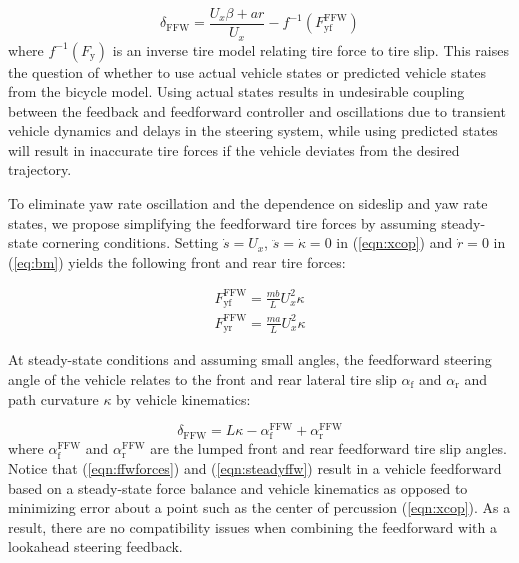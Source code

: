 \begin{equation}
\label{eqn:bikeffw}
\delta_\mathrm{FFW} = \frac{U_x\beta + ar}{U_x} - f^{-1}(F^\mathrm{FFW}_\mathrm{yf})
\end{equation}
where $f^{-1}(F_\mathrm{y})$ is an inverse tire model relating tire force to tire slip. This raises the question of 
whether to use actual vehicle states or predicted vehicle states from the bicycle model. Using actual states
results in undesirable coupling between the feedback and feedforward controller and oscillations due to transient vehicle dynamics and 
delays in the steering system, while using predicted states will result in inaccurate tire forces if the vehicle deviates from the desired trajectory.

To eliminate yaw rate oscillation and the dependence on sideslip and yaw rate states,
 we propose simplifying the feedforward tire forces by assuming steady-state cornering conditions. Setting $\dot{s} = U_x$, $\ddot{s} = \dot{\kappa} = 0$
in (\ref{eqn:xcop}) and $\dot{r} = 0$ in (\ref{eq:bm}) yields the following front and rear tire forces:

\begin{subequations}
\label{eqn:ffwforces}
\begin{align}
  F_\mathrm{yf}^\mathrm{FFW} = \frac{mb}{L} U_x^2\kappa\\
   F_\mathrm{yr}^\mathrm{FFW}=\frac{ma}{L} U_x^2\kappa
   \end{align}
\end{subequations}

At steady-state conditions and assuming small angles, the feedforward steering angle of the vehicle relates to the front and 
rear lateral tire slip $\alpha_\mathrm{f}$ and $\alpha_\mathrm{r}$ and path curvature $\kappa$ by vehicle kinematics:

\begin{equation}
\label{eqn:steadyffw}
\delta_{\mathrm{FFW}} = L\kappa - \alpha_\mathrm{f}^\mathrm{FFW}+\alpha_\mathrm{r}^\mathrm{FFW}
\end{equation}
where $\alpha_\mathrm{f}^\mathrm{FFW}$ and $\alpha_\mathrm{r}^\mathrm{FFW}$ are the lumped front and rear feedforward tire slip angles. Notice that
 (\ref{eqn:ffwforces}) and (\ref{eqn:steadyffw}) result in a vehicle feedforward based on a steady-state force balance and vehicle kinematics as opposed
to minimizing error about a point such as the center of percussion (\ref{eqn:xcop}). As a result, there are no compatibility issues
 when combining the feedforward with a lookahead steering feedback. 

